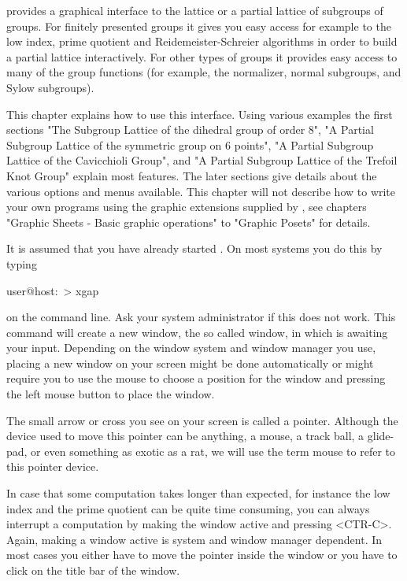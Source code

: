 
{\XGAP} provides a graphical interface to the  lattice or a partial lattice
of subgroups of groups.  For finitely  presented groups it gives you easy
access for example to the low index, prime quotient and Reidemeister-Schreier
algorithms in order to build a partial  lattice interactively.  For other
types of groups  it provides easy access to  many of  the group functions
(for example, the normalizer, normal subgroups, and Sylow subgroups).

This chapter explains how to use this interface.  Using various examples
the first sections "The Subgroup Lattice of the dihedral group of order 8",
"A Partial Subgroup Lattice of the symmetric group on 6 points", "A Partial
Subgroup Lattice of the Cavicchioli Group", and "A Partial Subgroup Lattice
of the Trefoil Knot Group" explain most features.  The later sections
give details about the various options and menus available.  This chapter
will not describe how to write your own programs using the graphic
extensions supplied by {\XGAP}, see chapters "Graphic Sheets - Basic graphic
operations" to "Graphic Posets" for details.

It is assumed that you have already started {\XGAP}.  On most systems you
do this by typing

\begintt 
user@host:~> xgap 
\endtt

on  the  command line.   Ask your  system administrator  if this does not
work.  This   command  will create   a new window,   the so called {\GAP}
window, in which {\GAP} is awaiting your input.   Depending on the window
system and window manager  you use, placing a new  window on your  screen
might be  done  automatically or might  require  you to use the  mouse to
choose a position for the  window and pressing the  left mouse button  to
place the window.

The small arrow   or cross you see on   your screen is  called a pointer.
Although the device used to move this pointer can be anything, a mouse, a
track ball, a glide-pad, or even something as exotic as a rat, we will use
the term mouse to refer to this pointer device.

In  case that some computation  takes  longer than expected, for instance
the low index and the prime quotient can be quite time consuming, you can
always interrupt  a computation  by  making the {\GAP}  window active and
pressing <CTR-C>.  Again, making  a  window active  is system and  window
manager dependent.   In most cases  you either have  to  move the pointer
inside  the {\GAP} window or you  have to click on the   title bar of the
{\GAP} window.

